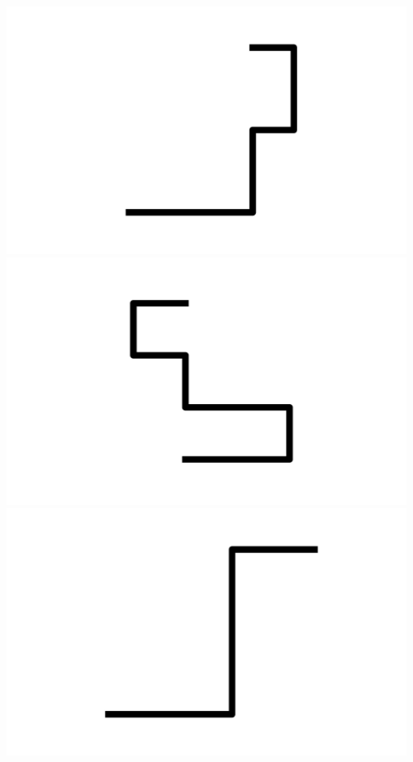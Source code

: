 \documentclass[]{report}
\begin{document}
\includegraphics[scale=.1]{pictures/21/state_cluster_shapes_424.pdf} 
\includegraphics[scale=.1]{pictures/21/state_cluster_shapes_425.pdf} 
\includegraphics[scale=.1]{pictures/21/state_cluster_shapes_426.pdf} 
\end{document}
